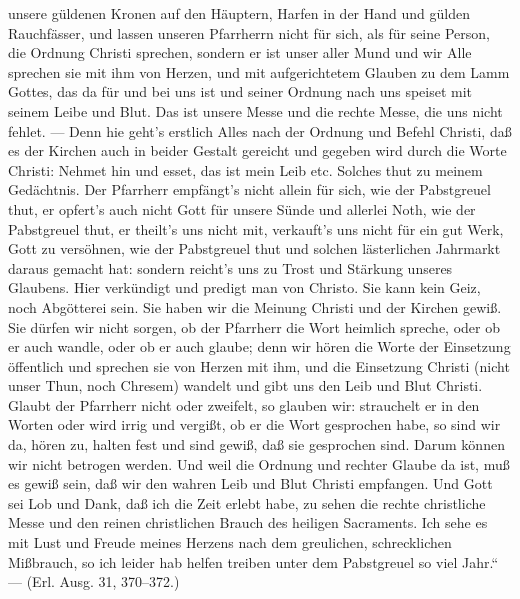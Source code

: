 unsere güldenen Kronen auf den Häuptern, Harfen in der Hand und gülden Rauchfässer, und lassen unseren Pfarrherrn nicht für sich, als für seine Person, die Ordnung Christi sprechen, sondern er ist unser aller Mund und wir Alle sprechen sie mit ihm von Herzen, und mit aufgerichtetem Glauben zu dem Lamm Gottes, das da für und bei uns ist und seiner Ordnung nach uns speiset mit seinem Leibe und Blut. Das ist unsere Messe und die rechte Messe, die uns nicht fehlet. — Denn hie geht’s erstlich Alles nach der Ordnung und Befehl Christi, daß es der Kirchen auch in beider Gestalt gereicht und gegeben wird durch die Worte Christi: Nehmet hin und esset, das ist mein Leib etc. Solches thut zu meinem Gedächtnis. Der Pfarrherr empfängt’s nicht allein für sich, wie der Pabstgreuel thut, er opfert’s auch nicht Gott für unsere Sünde und allerlei Noth, wie der Pabstgreuel thut, er theilt’s uns nicht mit, verkauft’s uns nicht für ein gut Werk, Gott zu versöhnen, wie der Pabstgreuel thut und solchen lästerlichen Jahrmarkt daraus gemacht hat: sondern reicht’s uns zu Trost und Stärkung unseres Glaubens. Hier verkündigt und predigt man von Christo. Sie kann kein Geiz, noch Abgötterei sein. Sie haben wir die Meinung Christi und der Kirchen gewiß. Sie dürfen wir nicht sorgen, ob der Pfarrherr die Wort heimlich spreche, oder ob er auch wandle, oder ob er auch glaube; denn wir hören die Worte der Einsetzung öffentlich und sprechen sie von Herzen mit ihm, und die Einsetzung Christi (nicht unser Thun, noch Chresem) wandelt und gibt uns den Leib und Blut Christi. Glaubt der Pfarrherr nicht oder zweifelt, so glauben wir: strauchelt er in den Worten oder wird irrig und vergißt, ob er die Wort gesprochen habe, so sind wir da, hören zu, halten fest und sind gewiß, daß sie gesprochen sind. Darum können wir nicht betrogen werden. Und weil die Ordnung und rechter Glaube da ist, muß es gewiß sein, daß wir den wahren Leib und Blut Christi empfangen. Und Gott sei Lob und Dank, daß ich die Zeit erlebt habe, zu sehen die rechte christliche Messe und den reinen christlichen Brauch des heiligen Sacraments. Ich sehe es mit Lust und Freude meines Herzens nach dem greulichen, schrecklichen Mißbrauch, so ich leider hab helfen treiben unter dem Pabstgreuel so viel Jahr.“ — (Erl. Ausg. 31, 370–372.)

